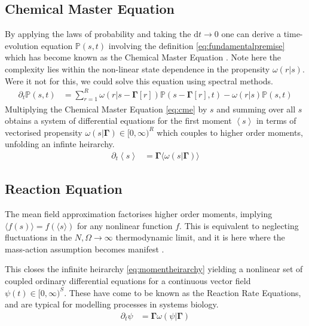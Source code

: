 \subsection{Chemical Master Equation}
By applying the laws of probability and taking the $\mathrm{d}t\rightarrow 0$
one can derive a time-evolution equation
$\mathbb{P}(s,t)$ involving the definition \eqref{eq:fundamentalpremise} which
has become known as the Chemical Master Equation \cite{Gillespie1992,Gillespie2007}.
Note here the complexity lies within the non-linear state dependence in the propensity
$\omega(r|s)$. Were it not for this, we could solve this equation using
spectral methods.
\begin{align}
	\partial_t\mathbb{P}(s,t) &=
	\sum_{r=1}^R
	\omega(r|s-\mathbf{\Gamma}[r])\mathbb{P}(s-\mathbf{\Gamma}[r],t)-\omega(r|s)\mathbb{P}(s,t)
	\label{eq:cme}
\end{align}
Multiplying the Chemical Master Equation \eqref{eq:cme} by $s$ and summing over all $s$
obtains a system of differential equations for the first moment
$\left\langle s \right\rangle$ in terms of vectorised propensity
$\omega(s|\mathbf{\Gamma})\in[0,\infty)^R$ which couples to higher order moments,
unfolding an infinte heirarchy.
\begin{align}
	\partial_t
	\left\langle s \right\rangle &=
	\mathbf{\Gamma} \big\langle \omega(s|\mathbf{\Gamma}) \big\rangle
	\label{eq:momentheirarchy}
\end{align}
\subsection{Reaction Equation}
The mean field approximation factorises higher order moments, implying
$\big\langle f(s) \big\rangle=f(\langle s\rangle)$ for any nonlinear
function $f$. This is equivalent to neglecting fluctuations in the
$N,\Omega\rightarrow\infty$
thermodynamic limit, and it is here where the mass-action assumption
becomes manifest \cite{Gillespie2007}.

This closes the infinite heirarchy
\eqref{eq:momentheirarchy} yielding a nonlinear set of coupled ordinary
differential equations for a continuous vector field $\psi(t)\in[0,\infty)^S$.
These have come to be known as the Reaction Rate Equations, and are
typical for modelling processes in systems biology.
\begin{align}
	\partial_t
	\psi &=
	\mathbf{\Gamma}\omega(\psi|\mathbf{\Gamma})
	\label{eq:reaction}
\end{align}

